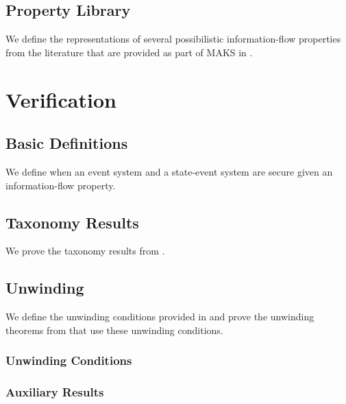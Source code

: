 \documentclass[10pt,a4paper]{article}
\begin{document}


\subsection{Property Library}
We define the representations of several possibilistic information-flow
properties from the literature that are provided as part of MAKS in {\cite{phd:Mantel2003}}.\\



\section{Verification}

\subsection{Basic Definitions}
We define when an event system and a state-event system are secure given an information-flow property.\\



\subsection{Taxonomy Results}
We prove the taxonomy results from {\cite{phd:Mantel2003}}.\\




\subsection{Unwinding}
We define the unwinding conditions provided in {\cite{phd:Mantel2003}} and prove the unwinding theorems from {\cite{phd:Mantel2003}} that use these unwinding conditions.\\

\subsubsection{Unwinding Conditions}


\subsubsection{Auxiliary Results}

\end{document}
